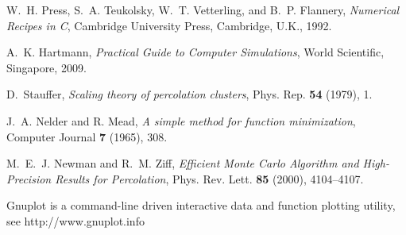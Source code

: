 \begin{thebibliography}{10}
	W.~H. Press, S.~A. Teukolsky, W.~T. Vetterling, and B.~P. Flannery,
  	\emph{{{N}umerical {R}ecipes in {C}}}, Cambridge University Press, 
	Cambridge, U.K., 1992.

	A.~K. Hartmann,
	\emph{Practical Guide to Computer Simulations},
	World Scientific, Singapore, 2009.

	D.~Stauffer, 
	\emph{{Scaling theory of percolation clusters}}, 
	Phys. Rep. \textbf{54} (1979), 1.

	J.~A. Nelder and R. Mead,
	\emph{A simple method for function minimization},
	Computer Journal \textbf{7} (1965), 308.

	M.~E.~J. Newman and R.~M. Ziff, 
	\emph{{Efficient Monte Carlo Algorithm and High-Precision Results for Percolation}}, 
	Phys. Rev. Lett. \textbf{85} (2000), 4104--4107.

	Gnuplot is a command-line driven interactive data and function plotting utility,
	see http://www.gnuplot.info

\end{thebibliography}
